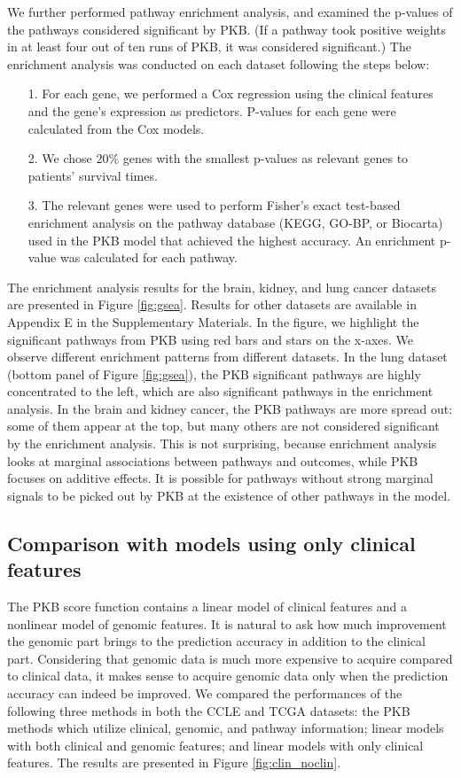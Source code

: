\documentclass[a4paper,12pt]{article}
\begin{document}
We further performed pathway enrichment analysis, and examined the p-values of the pathways considered significant by PKB. (If a pathway took positive weights in at least four out of ten runs of PKB, it was considered significant.) The enrichment analysis was conducted on each dataset following the steps below:
\begin{itemize}
	\item[1.] For each gene, we performed a Cox regression using the clinical features and the gene's expression as predictors. P-values for each gene were calculated from the Cox models.
	\item[2.] We chose $20\%$ genes with the smallest p-values as relevant genes to patients' survival times. 
	\item[3.] The relevant genes were used to perform Fisher's exact test-based  enrichment analysis \citep{huang2008bioinformatics} on the pathway database (KEGG, GO-BP, or Biocarta) used in the PKB model that achieved the highest accuracy. An enrichment p-value was calculated for each pathway.
\end{itemize}

The enrichment analysis results for the brain, kidney, and lung cancer datasets are presented in Figure \ref{fig:gsea}. Results for other datasets are available in Appendix E in the Supplementary Materials. In the figure, we highlight the significant pathways from PKB using red bars and stars on the x-axes. We observe different enrichment patterns from different datasets. In the lung dataset (bottom panel of Figure \ref{fig:gsea}), the PKB significant pathways are highly concentrated to the left, which are also significant pathways in the enrichment analysis. In the brain and kidney cancer, the PKB pathways are more spread out: some of them appear at the top, but many others are not considered significant by the enrichment analysis. This is not surprising, because enrichment analysis looks at marginal associations between pathways and outcomes, while PKB focuses on additive effects. It is possible for pathways without strong marginal signals to be picked out by PKB at the existence of other pathways in the model.


\subsection{Comparison with models using only clinical features}

The PKB score function contains a linear model of clinical features and a nonlinear model of genomic features. It is natural to ask how much improvement the genomic part brings to the prediction accuracy in addition to the clinical part. Considering that genomic data is much more expensive to acquire compared to clinical data, it makes sense to acquire genomic data only when the prediction accuracy can indeed be improved. We compared the performances of the following three methods in both the CCLE and TCGA datasets: the PKB methods which utilize clinical, genomic, and pathway information; linear models with both clinical and genomic features; and linear models with only clinical features. The results are presented in Figure \ref{fig:clin_noclin}. 
\end{document}

